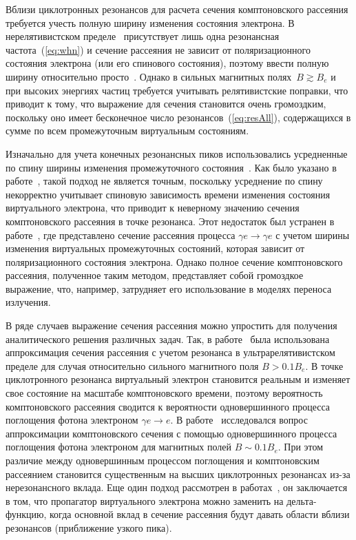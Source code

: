 Вблизи 
циклотронных резонансов для расчета сечения 
комптоновского рассеяния требуется учесть полную 
ширину изменения состояния электрона. В нерелятивистском 
пределе~\cite{Canuto:1971} присутствует лишь одна резонансная 
частота~(\ref{eq:whn}) и сечение рассеяния
не зависит от поляризационного состояния электрона (или его спинового состояния), 
поэтому ввести полную ширину относительно просто~\cite{Daugherty:1989}. Однако 
в сильных магнитных полях~$B\gtrsim B_e$ и при высоких энергиях частиц 
требуется учитывать релятивистские поправки, что приводит к тому, что выражение 
для  сечения 
становится очень громоздким, поскольку оно имеет бесконечное число 
резонансов~(\ref{eq:resAll}), 
содержащихся в сумме по всем промежуточным виртуальным состояниям.

Изначально для учета конечных резонансных пиков использовались усредненные по спину ширины изменения промежуточного состояния~\cite{Gonthier:2000, Holodov:2000}. 
Как было указано в работе~\cite{Gonthier:2014}, такой подход не является 
точным, поскольку усреднение по спину некорректно учитывает спиновую 
зависимость времени изменения состояния виртуального электрона, что приводит к неверному значению сечения комптоновского рассеяния в точке 
резонанса. Этот недостаток был устранен в работе~\cite{Mushtukov:2016}, где 
представлено сечение рассеяния процесса $\gamma e\to \gamma e$ с учетом 
ширины изменения виртуальных промежуточных состояний, которая 
зависит от 
поляризационного состояния электрона. 
Однако полное сечение комптоновского рассеяния, полученное таким методом, 
представляет собой громоздкое выражение, что, например, затрудняет его 
использование в моделях переноса излучения. 

В ряде случаев выражение сечения рассеяния можно упростить для получения 
аналитического 
решения различных задач. 
Так, в работе~\cite{Gonthier:2000} была использована 
аппроксимация сечения рассеяния с учетом резонанса в ультрарелятивистском 
пределе для случая относительно сильного магнитного поля $B>0.1 B_e$. В точке 
циклотронного резонанса виртуальный электрон становится реальным и изменяет свое состояние 
на масштабе комптоновского времени, поэтому вероятность
комптоновского рассеяния сводится к вероятности одновершинного процесса 
поглощения фотона электроном $\gamma 
e \to e$. В 
работе~\cite{Harding:1991} исследовался вопрос аппроксимации комптоновского 
сечения с помощью одновершинного процесса поглощения фотона электроном для 
магнитных полей 
$B\sim 
0.1B_e$. При этом различие между одновершинным процессом поглощения и комптоновским 
рассеянием становится существенным на высших циклотронных резонансах из-за 
нерезонансного вклада. Еще один подход рассмотрен в 
работах~\cite{Rumyantsev:2017,Rumyantsev:2026}, он заключается в том, что пропагатор 
виртуального электрона можно заменить 
на дельта-функцию, когда основной вклад 
в сечение рассеяния будут давать области вблизи резонансов (приближение узкого 
пика). 
 
